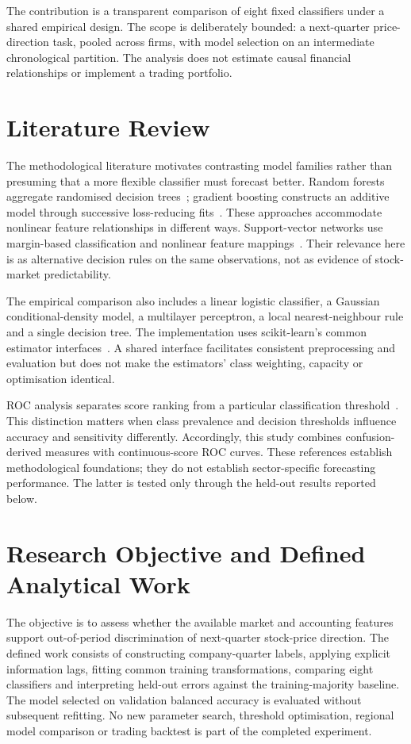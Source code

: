 \documentclass[letterpaper,10pt,conference]{ieeeconf}
\begin{document}
The contribution is a transparent comparison of eight fixed classifiers under a shared empirical design. The scope is deliberately bounded: a next-quarter price-direction task, pooled across firms, with model selection on an intermediate chronological partition. The analysis does not estimate causal financial relationships or implement a trading portfolio.

\section{Literature Review}
The methodological literature motivates contrasting model families rather than presuming that a more flexible classifier must forecast better. Random forests aggregate randomised decision trees~\cite{breiman2001}; gradient boosting constructs an additive model through successive loss-reducing fits~\cite{friedman2001}. These approaches accommodate nonlinear feature relationships in different ways. Support-vector networks use margin-based classification and nonlinear feature mappings~\cite{cortes1995}. Their relevance here is as alternative decision rules on the same observations, not as evidence of stock-market predictability.

The empirical comparison also includes a linear logistic classifier, a Gaussian conditional-density model, a multilayer perceptron, a local nearest-neighbour rule and a single decision tree. The implementation uses scikit-learn's common estimator interfaces~\cite{pedregosa2011}. A shared interface facilitates consistent preprocessing and evaluation but does not make the estimators' class weighting, capacity or optimisation identical.

ROC analysis separates score ranking from a particular classification threshold~\cite{fawcett2006}. This distinction matters when class prevalence and decision thresholds influence accuracy and sensitivity differently. Accordingly, this study combines confusion-derived measures with continuous-score ROC curves. These references establish methodological foundations; they do not establish sector-specific forecasting performance. The latter is tested only through the held-out results reported below.

\section{Research Objective and Defined Analytical Work}
The objective is to assess whether the available market and accounting features support out-of-period discrimination of next-quarter stock-price direction. The defined work consists of constructing company-quarter labels, applying explicit information lags, fitting common training transformations, comparing eight classifiers and interpreting held-out errors against the training-majority baseline. The model selected on validation balanced accuracy is evaluated without subsequent refitting. No new parameter search, threshold optimisation, regional model comparison or trading backtest is part of the completed experiment.
\end{document}
